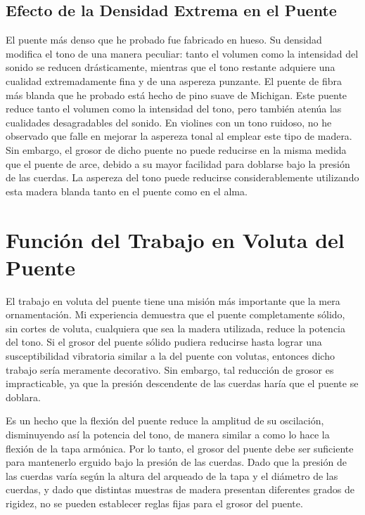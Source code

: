 \documentclass[12pt]{book}
\begin{document}
\subsection*{Efecto de la Densidad Extrema en el Puente}

El puente más denso que he probado fue fabricado en hueso. Su densidad modifica el tono de una manera peculiar: tanto el volumen como la intensidad del sonido se reducen drásticamente, mientras que el tono restante adquiere una cualidad extremadamente fina y de una aspereza punzante.
El puente de fibra más blanda que he probado está hecho de pino suave de Michigan. Este puente reduce tanto el volumen como la intensidad del tono, pero también atenúa las cualidades desagradables del sonido. En violines con un tono ruidoso, no he observado que falle en mejorar la aspereza tonal al emplear este tipo de madera. Sin embargo, el grosor de dicho puente no puede reducirse en la misma medida que el puente de arce, debido a su mayor facilidad para doblarse bajo la presión de las cuerdas. La aspereza del tono puede reducirse considerablemente utilizando esta madera blanda tanto en el puente como en el alma.

\section*{Función del Trabajo en Voluta del Puente}

El trabajo en voluta del puente tiene una misión más importante que la mera ornamentación. Mi experiencia demuestra que el puente completamente sólido, sin cortes de voluta, cualquiera que sea la madera utilizada, reduce la potencia del tono. Si el grosor del puente sólido pudiera reducirse hasta lograr una susceptibilidad vibratoria similar a la del puente con volutas, entonces dicho trabajo sería meramente decorativo. Sin embargo, tal reducción de grosor es impracticable, ya que la presión descendente de las cuerdas haría que el puente se doblara. 

Es un hecho que la flexión del puente reduce la amplitud de su oscilación, disminuyendo así la potencia del tono, de manera similar a como lo hace la flexión de la tapa armónica. Por lo tanto, el grosor del puente debe ser suficiente para mantenerlo erguido bajo la presión de las cuerdas. Dado que la presión de las cuerdas varía según la altura del arqueado de la tapa y el diámetro de las cuerdas, y dado que distintas muestras de madera presentan diferentes grados de rigidez, no se pueden establecer reglas fijas para el grosor del puente. 
\end{document}
